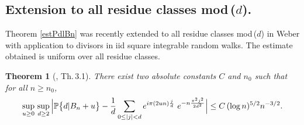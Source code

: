 \documentclass[11pt,draft,reqno]{amsart}
\newtheorem{theorem}{Theorem}[section]
\theoremstyle{definition}
\theoremstyle{remarks}
\numberwithin{equation}{section}
\def \s{{\sigma}}
\def\P{{\mathcal P}}
\def\E{{\mathbb E \,}}
\def\P{{\mathbb P}}
\def\beq{\begin{equation}}
\def\eeq{\end{equation}}
\begin{document}
  
  
  
  
  

 
 

 \subsection{Extension to all residue classes mod\,($d$).}  
%
     Theorem \ref{estPdlBn} was recently  extended to all residue classes mod\,($d$) in   Weber \cite{W9} with application to divisors in iid square integrable random walks.
   The  estimate   obtained  is   uniform over  all residue classes. 
 
 \begin{theorem}[\cite{W9}, Th.\,3.1]\label{estPdlBn.u} 
There exist  two absolute constants $C$ and $n_0$ such that for all $n\ge n_0$,
\begin{equation*}
 \sup_{u\ge 0}\,\sup_{d\ge 2}\Big|\P\big\{  d|   B_{ n}+u \big\}-  {1\over d}\sum_{ 0\le |j|< d }
e^{i\pi (2un){j\over d}}\  e^{  -n  
{\pi^2j^2\over 2d^2}}\Big|\le C\, (\log n)^{5/2}n^{-3/2}.
\end{equation*}

\end{theorem}
\end{document}
